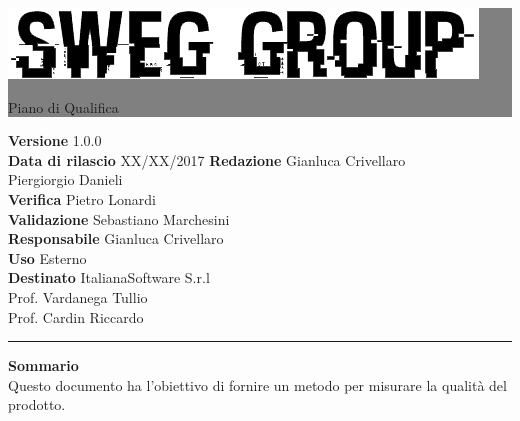 \documentclass[12pt,a4paper,titlepage]{article}
\newcommand{\HRule}[1]{\hfill \rule{0.2\linewidth}{#1}} %
\begin{document}
	
	\thispagestyle{empty} %
	
	
	\colorbox{grey}{
		\parbox[t]{1.0\linewidth}{
			\centering \fontsize{50pt}{80pt}\selectfont %
			\vspace*{0.7cm} %
			
			\raggedleft
			\includegraphics[width=0.7\linewidth]{../../LogoSWEgGroupSFONDOVUOTO}
			
			\hfill Piano di Qualifica \\
			
			\vspace*{0.7cm} %
		}
	}
	
	
	\vfill %
	
	
	{\centering \large 
		\hfill \textbf{Versione} 1.0.0 \\
		\hfill \textbf{Data di rilascio} XX/XX/2017
		\hfill \textbf{Redazione} Gianluca Crivellaro \\
		\hfill Piergiorgio Danieli \\
		\hfill \textbf{Verifica} Pietro Lonardi \\
		\hfill \textbf{Validazione} Sebastiano Marchesini \\
		\hfill \textbf{Responsabile} Gianluca Crivellaro \\
		\hfill \textbf{Uso} Esterno \\
		\hfill \textbf{Destinato} ItalianaSoftware S.r.l \\
		\hfill Prof. Vardanega Tullio \\
		\hfill Prof. Cardin Riccardo \\ 
		
		\HRule{1pt}
		
		\textbf{Sommario} \\
		Questo documento ha l'obiettivo di fornire un metodo per misurare la qualità del prodotto.
		
	} %
	
\end{document}
